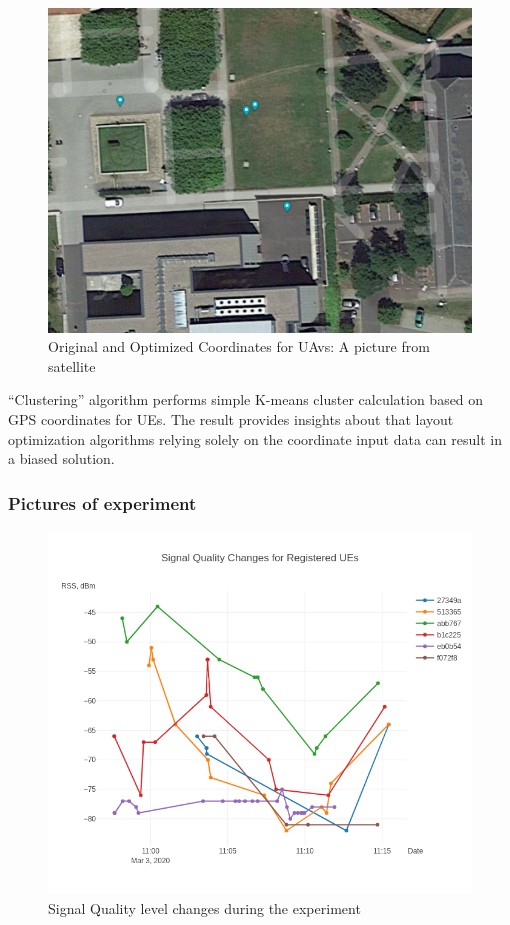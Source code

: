 \begin{figure}[H]
	\centering
	\includegraphics[width=\linewidth,keepaspectratio]{images/Expt4_Result_of_optimization_sattelite.png}
\caption{Original and Optimized Coordinates for UAvs: A picture from
satellite}
\end{figure}

``Clustering'' algorithm performs simple K-means cluster calculation
based on GPS coordinates for UEs. The result provides insights about
that layout optimization algorithms relying solely on the coordinate
input data can result in a biased solution.

\subsubsection{Pictures of experiment}

\begin{figure}[H]
	\centering
	\includegraphics[width=\linewidth,keepaspectratio]{images/Exp4-Overall-Signal-Changes.png}
\caption{Signal Quality level changes during the experiment}
\end{figure}

